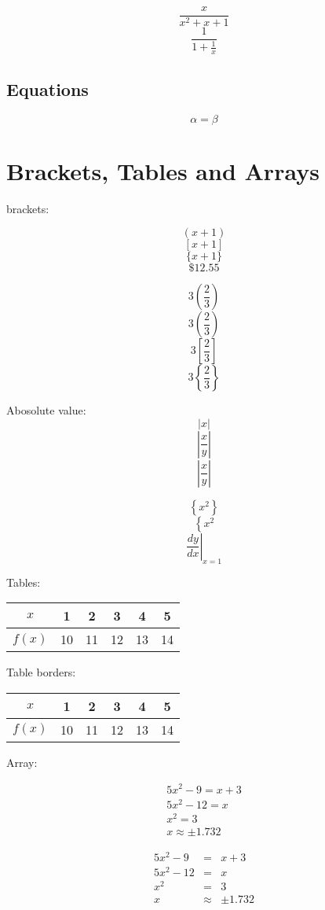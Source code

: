 \documentclass[12pt]{article}
\begin{document}
$$\frac{x}{x^2+x+1}$$
$$\frac{1}{1+\frac{1}{x}}$$


\subsection{Equations}

\begin{equation}
\alpha=\beta
\end{equation}

\section{Brackets, Tables and Arrays}

brackets:

$$(x+1)$$
$$[x+1]$$
$$\{x+1\}$$
$$\$12.55$$

$$3(\frac{2}{3})$$
$$3\left(\frac{2}{3}\right)$$
$$3\left[\frac{2}{3}\right]$$
$$3\left\{\frac{2}{3}\right\}$$

Abosolute value:
$$|x|$$
$$|\frac{x}{y}|$$
$$\left|\frac{x}{y}\right|$$

$$\left\{x^2\right\}$$
$$\left\{x^2\right.$$
$$\left.\frac{dy}{dx}\right|_{x=1}$$

Tables:
\begin{tabular}{|c|ccccc|}

$x$ & 1 & 2 & 3 & 4 & 5 \\ \hline
$f(x)$ & 10 & 11 & 12 & 13 & 14 \\

\end{tabular}

Table borders:
\begin{tabular}{|c|ccccc|}
\hline
$x$ & 1 & 2 & 3 & 4 & 5 \\ \hline
$f(x)$ & 10 & 11 & 12 & 13 & 14 \\
\hline
\end{tabular}

Array:

\begin{eqnarray}
5x^2-9=x+3\\
5x^2-12=x\\
x^2=3\\
x\approx\pm1.732
\end{eqnarray}

\begin{eqnarray}
5x^2-9&=&x+3\\
5x^2-12&=&x\\
x^2&=&3\\
x&\approx&\pm1.732
\end{eqnarray}
\end{document}

